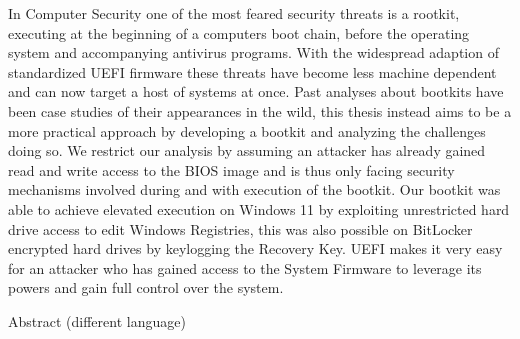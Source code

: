 

\label{sec:abstract}

In Computer Security one of the most feared security threats is a rootkit, executing at the beginning of a computers boot chain, before the operating system and accompanying antivirus programs. With the widespread adaption of standardized UEFI firmware these threats have become less machine dependent and can now target a host of systems at once.
Past analyses about bootkits have been case studies of their appearances in the wild, this thesis instead aims to be a more practical approach by developing a bootkit and analyzing the challenges doing so.
We restrict our analysis by assuming an attacker has already gained read and write access to the BIOS image and is thus only facing security mechanisms involved during and with execution of the bootkit.
Our bootkit was able to achieve elevated execution on Windows 11 by exploiting unrestricted hard drive access to edit Windows Registries, this was also possible on BitLocker encrypted hard drives by keylogging the Recovery Key.
UEFI makes it very easy for an attacker who has gained access to the System Firmware to leverage its powers and gain full control over the system.

\vspace*{20mm}

{Abstract (different language)}
\label{sec:abstract-diff}

\blindtext
